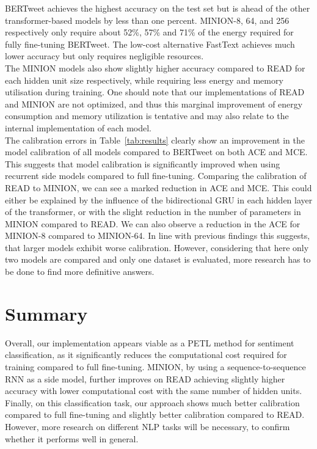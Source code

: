 \documentclass[10pt,conference,compsocconf]{IEEEtran}
\begin{document}
BERTweet achieves the highest accuracy on the test set but is ahead of the other transformer-based models by less than one percent. MINION-8, 64, and 256 respectively only require about 52\%, 57\% and 71\% of the energy required for fully fine-tuning BERTweet. The low-cost alternative FastText achieves much lower accuracy but only requires negligible resources. \\
The MINION models also show slightly higher accuracy compared to READ for each hidden unit size respectively, while requiring less energy and memory utilisation during training. One should note that our implementations of READ and MINION are not optimized, and thus this marginal improvement of energy consumption and memory utilization is tentative and may also relate to the internal implementation of each model.\\
The calibration errors in Table~\ref{tab:results} clearly show an improvement in the model calibration of all models compared to BERTweet on both ACE and MCE. This suggests that model calibration is significantly improved when using recurrent side models compared to full fine-tuning.
Comparing the calibration of READ to MINION, we can see a marked reduction in ACE and MCE. This could either be explained by the influence of the bidirectional GRU in each hidden layer of the transformer, or with the slight reduction in the number of parameters in MINION compared to READ. We can also observe a reduction in the ACE for MINION-8 compared to MINION-64. In line with previous findings \cite{guo2017calibration} this suggests, that larger models exhibit worse calibration. However, considering that here only two models are compared and only one dataset is evaluated, more research has to be done to find more definitive answers.

\section{Summary}
\label{sec:summary}
Overall, our implementation appears viable as a PETL method for sentiment classification, as it significantly reduces the computational cost required for training compared to full fine-tuning. MINION, by using a sequence-to-sequence RNN as a side model, further improves on READ \cite{read} achieving slightly higher accuracy with lower computational cost with the same number of hidden units. Finally, on this classification task, our approach shows much better calibration compared to full fine-tuning and slightly better calibration compared to READ. However, more research on different NLP tasks will be necessary, to confirm whether it performs well in general.



\end{document}
